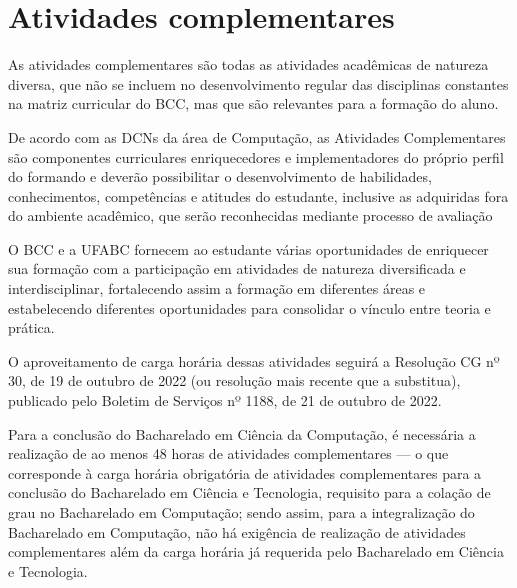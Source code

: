 \section{Atividades complementares}
\label{sec:atividades_complementares}

As atividades complementares são todas as atividades acadêmicas de
natureza diversa, que não se incluem no desenvolvimento regular das
disciplinas constantes na matriz curricular do BCC, mas que são
relevantes para a formação do aluno.

De acordo com as DCNs da área de Computação, as Atividades
Complementares são componentes curriculares enriquecedores e
implementadores do próprio perfil do formando e deverão possibilitar o
desenvolvimento de habilidades, conhecimentos, competências e atitudes
do estudante, inclusive as adquiridas fora do ambiente acadêmico, que
serão reconhecidas mediante processo de avaliação

O BCC e a UFABC fornecem ao estudante várias oportunidades de
enriquecer sua formação com a participação em atividades de natureza
diversificada e interdisciplinar, fortalecendo assim a formação em
diferentes áreas e estabelecendo diferentes oportunidades para
consolidar o vínculo entre teoria e prática.

O aproveitamento de carga horária dessas atividades seguirá a
Resolução CG nº 30, de 19 de outubro de 2022 (ou resolução mais
recente que a substitua), publicado pelo Boletim de Serviços nº 1188,
de 21 de outubro de 2022.

Para a conclusão do Bacharelado em Ciência da Computação, é necessária
a realização de ao menos 48 horas de atividades complementares — o que
corresponde à carga horária obrigatória de atividades complementares
para a conclusão do Bacharelado em Ciência e Tecnologia, requisito
para a colação de grau no Bacharelado em Computação; sendo assim, para
a integralização do Bacharelado em Computação, não há exigência de
realização de atividades complementares além da carga horária já
requerida pelo Bacharelado em Ciência e Tecnologia.

